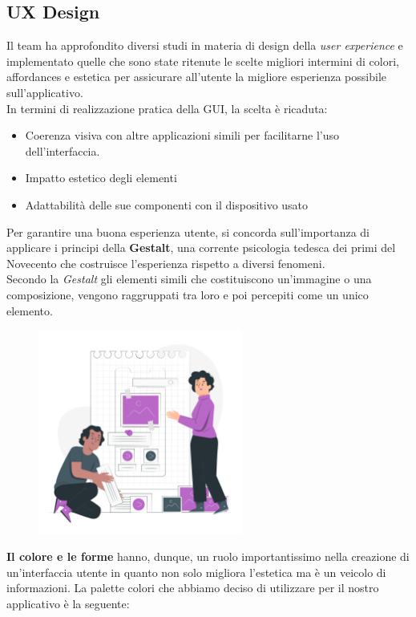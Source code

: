 \documentclass{article}
\begin{document}
		\subsection{UX Design}
		Il team ha approfondito diversi studi in materia di design della \textit{user experience} e implementato quelle che sono state ritenute le scelte migliori intermini di colori, affordances e estetica per assicurare all’utente la migliore esperienza possibile sull’applicativo.\\
		In termini di realizzazione pratica della GUI, la scelta è ricaduta:
		\begin{itemize}
			\item Coerenza visiva con altre applicazioni simili per facilitarne l'uso dell'interfaccia.
			\item Impatto estetico degli elementi
			\item Adattabilità delle sue componenti con il dispositivo usato
		\end{itemize}
		Per garantire una buona esperienza utente, si concorda sull'importanza di applicare i principi della \textbf{Gestalt}, una corrente psicologia tedesca dei primi del Novecento che costruisce l'esperienza rispetto a diversi fenomeni. 
		\\Secondo la \textit{Gestalt} gli elementi simili che costituiscono un'immagine o una composizione, vengono raggruppati tra loro e poi percepiti come un unico elemento.
		\begin{figure}[H]
			\centering
			\includegraphics[width=0.6\textwidth]{uxdesign.png}
		\end{figure}
		\textbf{Il colore e le forme} hanno, dunque, un ruolo importantissimo nella creazione di un'interfaccia utente in quanto non solo migliora l'estetica ma è un veicolo di informazioni.
		La palette colori che abbiamo deciso di utilizzare per il nostro applicativo è la seguente:
\end{document}
